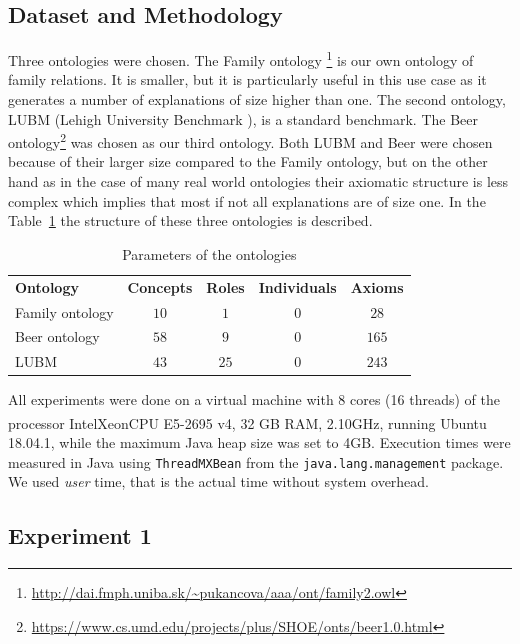 \documentclass[12pt,a4paper]{article}
\begin{document}
\subsection{Dataset and Methodology}

Three ontologies were chosen. The Family ontology
\footnote{\url{http://dai.fmph.uniba.sk/~pukancova/aaa/ont/family2.owl}} is our own ontology of family relations. It is smaller, but it is particularly useful in this use case as it generates a number of explanations of size higher than one. The second ontology, LUBM (Lehigh University Benchmark \cite{LUBM}), is a standard benchmark. The Beer ontology\footnote{\url{https://www.cs.umd.edu/projects/plus/SHOE/onts/beer1.0.html}} was chosen as our third ontology. Both LUBM and Beer were chosen because of their larger size compared to the Family ontology, but on the other hand as in the case of many real world ontologies their axiomatic structure is less complex which implies that most if not all explanations are of size one. In the Table~\ref{tab:ont} the structure of these three ontologies is described.

\begin{table}[h!]
	\centering
	\caption{Parameters of the ontologies}
	\label{tab:ont}
	\begin{tabular}{lcccc} 
		\addlinespace[0.3cm]
		\textbf{Ontology} & \textbf{Concepts} & \textbf{Roles} &
		\textbf{Individuals} & \textbf{Axioms} \\
		\addlinespace[0.3cm]
		Family ontology & $10$ & $1$ & $0$ & $28$\\
		\addlinespace[0.3cm]
		Beer ontology & $58$ & $9$ & $0$ & $165$\\
		\addlinespace[0.3cm]
		LUBM & $43$ & $25$ & $0$ & $243$
	\end{tabular}
\end{table}

All experiments were done on a virtual machine with 8 cores (16 threads) of
the processor Intel\textsuperscript \textregistered Xeon\textsuperscript
\textregistered CPU E5-2695 v4, 32 GB RAM, 2.10GHz, running Ubuntu 18.04.1,
while the maximum Java heap size was set to 4GB. Execution times were measured
in Java using \texttt{ThreadMXBean} from the \texttt{java.lang.management}
package. We used \emph{user} time, that is the actual time without system
overhead.

\subsection{Experiment 1}
\end{document}
